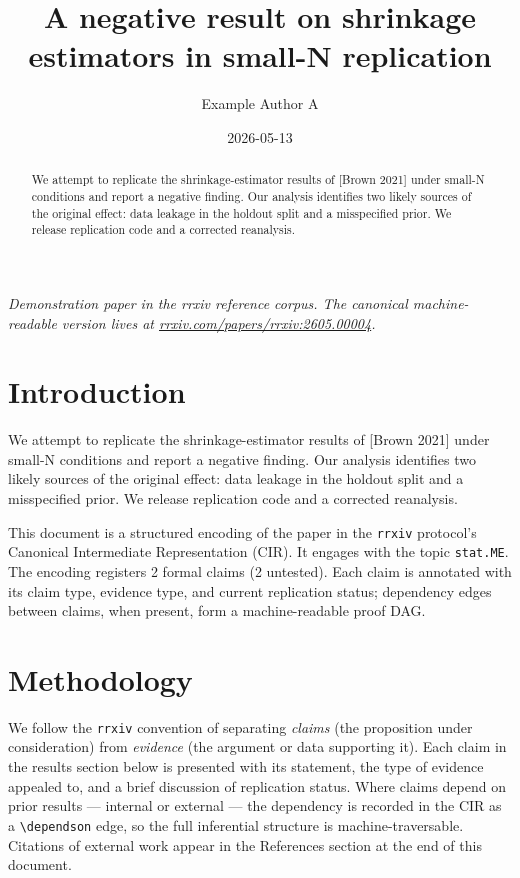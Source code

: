 \documentclass{rrxiv}
\title{A negative result on shrinkage estimators in small-N replication}
\author{Example Author A}
\date{2026-05-13}
\begin{document}
\maketitle

\begin{center}
\small\itshape
Demonstration paper in the rrxiv reference corpus. The canonical machine-readable version lives at \href{https://rrxiv.com/papers/rrxiv:2605.00004}{rrxiv.com/papers/rrxiv:2605.00004}.
\end{center}

\begin{abstract}
We attempt to replicate the shrinkage-estimator results of [Brown 2021] under small-N conditions and report a negative finding. Our analysis identifies two likely sources of the original effect: data leakage in the holdout split and a misspecified prior. We release replication code and a corrected reanalysis.
\end{abstract}

\section{Introduction}
We attempt to replicate the shrinkage-estimator results of [Brown 2021] under small-N conditions and report a negative finding. Our analysis identifies two likely sources of the original effect: data leakage in the holdout split and a misspecified prior. We release replication code and a corrected reanalysis.

This document is a structured encoding of the paper in the \texttt{rrxiv} protocol's Canonical Intermediate Representation (CIR). It engages with the topic \texttt{stat.ME}. The encoding registers 2 formal claims (2 untested). Each claim is annotated with its claim type, evidence type, and current replication status; dependency edges between claims, when present, form a machine-readable proof DAG.

\section{Methodology}
We follow the \texttt{rrxiv} convention of separating \emph{claims} (the proposition under consideration) from \emph{evidence} (the argument or data supporting it). Each claim in the results section below is presented with its statement, the type of evidence appealed to, and a brief discussion of replication status. Where claims depend on prior results --- internal or external --- the dependency is recorded in the CIR as a \texttt{\textbackslash dependson} edge, so the full inferential structure is machine-traversable. Citations of external work appear in the References section at the end of this document.
\end{document}
